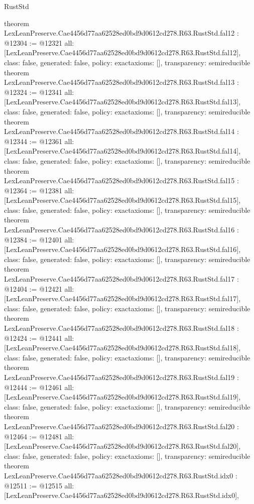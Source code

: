 \begin{lexlean}{RustStd}
\begin{coremodule}
{}
theorem LexLeanPreserve.Cae4456d77aa62528ed0bd9d0612cd278.R63.RustStd.fal12 : @12304 := @12321 {
  all: [LexLeanPreserve.Cae4456d77aa62528ed0bd9d0612cd278.R63.RustStd.fal12],
  class: false,
  generated: false,
  policy: exact{axioms: []},
  transparency: semireducible
}
theorem LexLeanPreserve.Cae4456d77aa62528ed0bd9d0612cd278.R63.RustStd.fal13 : @12324 := @12341 {
  all: [LexLeanPreserve.Cae4456d77aa62528ed0bd9d0612cd278.R63.RustStd.fal13],
  class: false,
  generated: false,
  policy: exact{axioms: []},
  transparency: semireducible
}
theorem LexLeanPreserve.Cae4456d77aa62528ed0bd9d0612cd278.R63.RustStd.fal14 : @12344 := @12361 {
  all: [LexLeanPreserve.Cae4456d77aa62528ed0bd9d0612cd278.R63.RustStd.fal14],
  class: false,
  generated: false,
  policy: exact{axioms: []},
  transparency: semireducible
}
theorem LexLeanPreserve.Cae4456d77aa62528ed0bd9d0612cd278.R63.RustStd.fal15 : @12364 := @12381 {
  all: [LexLeanPreserve.Cae4456d77aa62528ed0bd9d0612cd278.R63.RustStd.fal15],
  class: false,
  generated: false,
  policy: exact{axioms: []},
  transparency: semireducible
}
theorem LexLeanPreserve.Cae4456d77aa62528ed0bd9d0612cd278.R63.RustStd.fal16 : @12384 := @12401 {
  all: [LexLeanPreserve.Cae4456d77aa62528ed0bd9d0612cd278.R63.RustStd.fal16],
  class: false,
  generated: false,
  policy: exact{axioms: []},
  transparency: semireducible
}
theorem LexLeanPreserve.Cae4456d77aa62528ed0bd9d0612cd278.R63.RustStd.fal17 : @12404 := @12421 {
  all: [LexLeanPreserve.Cae4456d77aa62528ed0bd9d0612cd278.R63.RustStd.fal17],
  class: false,
  generated: false,
  policy: exact{axioms: []},
  transparency: semireducible
}
theorem LexLeanPreserve.Cae4456d77aa62528ed0bd9d0612cd278.R63.RustStd.fal18 : @12424 := @12441 {
  all: [LexLeanPreserve.Cae4456d77aa62528ed0bd9d0612cd278.R63.RustStd.fal18],
  class: false,
  generated: false,
  policy: exact{axioms: []},
  transparency: semireducible
}
theorem LexLeanPreserve.Cae4456d77aa62528ed0bd9d0612cd278.R63.RustStd.fal19 : @12444 := @12461 {
  all: [LexLeanPreserve.Cae4456d77aa62528ed0bd9d0612cd278.R63.RustStd.fal19],
  class: false,
  generated: false,
  policy: exact{axioms: []},
  transparency: semireducible
}
theorem LexLeanPreserve.Cae4456d77aa62528ed0bd9d0612cd278.R63.RustStd.fal20 : @12464 := @12481 {
  all: [LexLeanPreserve.Cae4456d77aa62528ed0bd9d0612cd278.R63.RustStd.fal20],
  class: false,
  generated: false,
  policy: exact{axioms: []},
  transparency: semireducible
}
theorem LexLeanPreserve.Cae4456d77aa62528ed0bd9d0612cd278.R63.RustStd.idx0 : @12511 := @12515 {
  all: [LexLeanPreserve.Cae4456d77aa62528ed0bd9d0612cd278.R63.RustStd.idx0],
}
\end{coremodule}
\end{lexlean}
